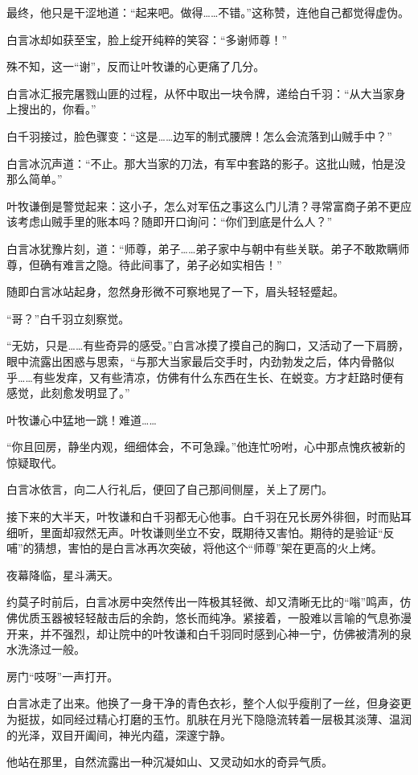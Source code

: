 最终，他只是干涩地道：“起来吧。做得……不错。”这称赞，连他自己都觉得虚伪。

白言冰却如获至宝，脸上绽开纯粹的笑容：“多谢师尊！”

殊不知，这一“谢”，反而让叶牧谦的心更痛了几分。

白言冰汇报完屠戮山匪的过程，从怀中取出一块令牌，递给白千羽：“从大当家身上搜出的，你看。”

白千羽接过，脸色骤变：“这是……边军的制式腰牌！怎么会流落到山贼手中？”

白言冰沉声道：“不止。那大当家的刀法，有军中套路的影子。这批山贼，怕是没那么简单。”

叶牧谦倒是警觉起来：这小子，怎么对军伍之事这么门儿清？寻常富商子弟不更应该考虑山贼手里的账本吗？随即开口询问：“你们到底是什么人？”

白言冰犹豫片刻，道：“师尊，弟子……弟子家中与朝中有些关联。弟子不敢欺瞒师尊，但确有难言之隐。待此间事了，弟子必如实相告！”

随即白言冰站起身，忽然身形微不可察地晃了一下，眉头轻轻蹙起。

“哥？”白千羽立刻察觉。

“无妨，只是……有些奇异的感受。”白言冰摸了摸自己的胸口，又活动了一下肩膀，眼中流露出困惑与思索，“与那大当家最后交手时，内劲勃发之后，体内骨骼似乎……有些发痒，又有些清凉，仿佛有什么东西在生长、在蜕变。方才赶路时便有感觉，此刻愈发明显了。”

叶牧谦心中猛地一跳！难道……

“你且回房，静坐内观，细细体会，不可急躁。”他连忙吩咐，心中那点愧疚被新的惊疑取代。

白言冰依言，向二人行礼后，便回了自己那间侧屋，关上了房门。

接下来的大半天，叶牧谦和白千羽都无心他事。白千羽在兄长房外徘徊，时而贴耳细听，里面却寂然无声。叶牧谦则坐立不安，既期待又害怕。期待的是验证“反哺”的猜想，害怕的是白言冰再次突破，将他这个“师尊”架在更高的火上烤。

夜幕降临，星斗满天。

约莫子时前后，白言冰房中突然传出一阵极其轻微、却又清晰无比的“嗡”鸣声，仿佛优质玉器被轻轻敲击后的余韵，悠长而纯净。紧接着，一股难以言喻的气息弥漫开来，并不强烈，却让院中的叶牧谦和白千羽同时感到心神一宁，仿佛被清冽的泉水洗涤过一般。

房门“吱呀”一声打开。

白言冰走了出来。他换了一身干净的青色衣衫，整个人似乎瘦削了一丝，但身姿更为挺拔，如同经过精心打磨的玉竹。肌肤在月光下隐隐流转着一层极其淡薄、温润的光泽，双目开阖间，神光内蕴，深邃宁静。

他站在那里，自然流露出一种沉凝如山、又灵动如水的奇异气质。

